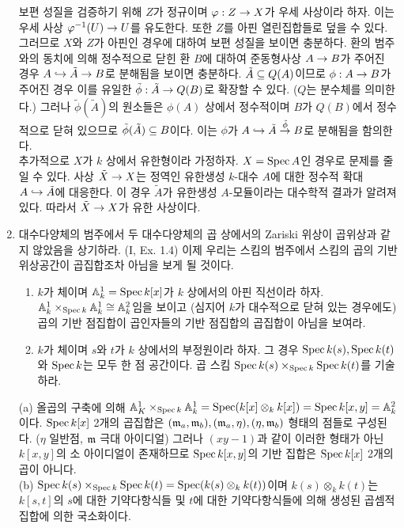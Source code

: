 \begin{enumerate}[label=\tb{3.\arabic*.},itemindent=0mm,itemsep=4mm]
	보편 성질을 검증하기 위해 $Z$가 정규이며 $\varphi:Z\rightarrow X$가 우세 사상이라 하자.
	이는 우세 사상 $\varphi^{-1}(U)\rightarrow U$를 유도한다. 또한 $Z$를 아핀 열린집합들로 덮을 수 있다.
	그러므로 $X$와 $Z$가 아핀인 경우에 대하여 보편 성질을 보이면 충분하다.
	환의 범주와의 동치에 의해 정수적으로 닫힌 환 $B$에 대하여 준동형사상 $A\rightarrow B$가 주어진 경우
	$A\hookrightarrow\tilde A\rightarrow B$로 분해됨을 보이면 충분하다.
	$\tilde A\subseteq Q(A)$이므로 $\phi:A\rightarrow B$가 주어진 경우 이를 유일한 $\tilde\phi:\tilde A\rightarrow Q(B)$로 확장할 수 있다.
	($Q$는 분수체를 의미한다.)
	그러나 $\tilde\phi(\tilde A)$의 원소들은 $\phi(A)$ 상에서 정수적이며 $B$가 $Q(B)$에서 정수적으로 닫혀 있으므로
	$\tilde\phi(\tilde A)\subseteq B$이다. 이는 $\phi$가 $A\hookrightarrow\tilde A\stackrel{\tilde\phi}{\rightarrow} B$로 분해됨을 함의한다.\\
	추가적으로 $X$가 $k$ 상에서 유한형이라 가정하자. $X=\operatorname{Spec} A$인 경우로 문제를 줄일 수 있다.
	사상 $\tilde X\rightarrow X$는 정역인 유한생성 $k$-대수 $A$에 대한 정수적 확대 $A\hookrightarrow\tilde A$에 대응한다.
	이 경우 $\tilde A$가 유한생성 $A$-모듈이라는 대수학적 결과가 알려져 있다. 따라서 $\tilde X\rightarrow X$가 유한 사상이다.
	\item {} 대수다양체의 범주에서 두 대수다양체의 곱 상에서의 Zariski 위상이 곱위상과 같지 않았음을 상기하라.
	(I, Ex. 1.4) 이제 우리는 스킴의 범주에서 스킴의 곱의 기반 위상공간이 곱집합조차 아님을 보게 될 것이다.
	\begin{enumerate}[label=(\alph*)]
	\item $k$가 체이며 $\mathbb{A}^1_k=\operatorname{Spec} k[x]$가 $k$ 상에서의 아핀 직선이라 하자.
	$\mathbb{A}^1_k\times_{\operatorname{Spec} k}\mathbb{A}^1_k\cong\mathbb{A}^2_k$임을 보이고
	(심지어 $k$가 대수적으로 닫혀 있는 경우에도) 곱의 기반 점집합이 곱인자들의 기반 점집합의 곱집합이 아님을 보여라.
	\item $k$가 체이며 $s$와 $t$가 $k$ 상에서의 부정원이라 하자. 그 경우 $\operatorname{Spec} k(s),\operatorname{Spec} k(t)$와 $\operatorname{Spec} k$는 모두 한 점 공간이다.
	곱 스킴 $\operatorname{Spec} k(s)\times_{\operatorname{Spec} k}\operatorname{Spec} k(t)$를 기술하라.
	\end{enumerate}
	\sol (a) 올곱의 구축에 의해 $\mathbb{A}^1_K\times_{\operatorname{Spec} k}\mathbb{A}^1_k=\operatorname{Spec}(k[x]\otimes_kk[x])=\operatorname{Spec} k[x,y]=\mathbb{A}^2_k$이다.
	$\operatorname{Spec} k[x]$ 2개의 곱집합은 $(\mathfrak{m}_a,\mathfrak{m}_b),(\mathfrak{m}_a,\eta),(\eta,\mathfrak{m}_b)$ 형태의 점들로 구성된다.
	($\eta$ 일반점, $\mathfrak{m}$ 극대 아이디얼)
	그러나 $(xy-1)$과 같이 이러한 형태가 아닌 $k[x,y]$의 소 아이디얼이 존재하므로
	$\operatorname{Spec} k[x,y]$의 기반 집합은 $\operatorname{Spec} k[x]$ 2개의 곱이 아니다.\\
	(b) $\operatorname{Spec} k(s)\times_{\operatorname{Spec} k}\operatorname{Spec} k(t)=\operatorname{Spec}(k(s)\otimes_kk(t))$이며
	$k(s)\otimes_kk(t)$는 $k[s,t]$의 $s$에 대한 기약다항식들 및 $t$에 대한 기약다항식들에 의해 생성된 곱셈적 집합에 의한 국소화이다.

\end{enumerate}
